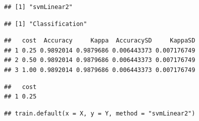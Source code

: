\documentclass[12pt,spanish,a4paper]{article}
\newenvironment{Shaded}{\begin{snugshade}}{\end{snugshade}}
\newcommand{\OperatorTok}[1]{\textcolor[rgb]{0.81,0.36,0.00}{\textbf{#1}}}
\newcommand{\NormalTok}[1]{#1}
\numberwithin{equation}{section}
\begin{document}
\begin{verbatim}
## [1] "svmLinear2"
\end{verbatim}

\begin{Shaded}
\end{Shaded}

\begin{verbatim}
## [1] "Classification"
\end{verbatim}

\begin{Shaded}
\end{Shaded}

\begin{verbatim}
##   cost  Accuracy     Kappa  AccuracySD     KappaSD
## 1 0.25 0.9892014 0.9879686 0.006443373 0.007176749
## 2 0.50 0.9892014 0.9879686 0.006443373 0.007176749
## 3 1.00 0.9892014 0.9879686 0.006443373 0.007176749
\end{verbatim}

\begin{Shaded}
\end{Shaded}

\begin{verbatim}
##   cost
## 1 0.25
\end{verbatim}

\begin{Shaded}
\end{Shaded}

\begin{verbatim}
## train.default(x = X, y = Y, method = "svmLinear2")
\end{verbatim}

\begin{Shaded}
\end{Shaded}
\end{document}
